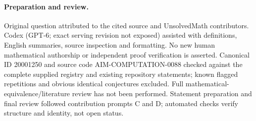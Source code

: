 \documentclass[11pt]{article}
\begin{document}
\paragraph{Preparation and review.}
Original question attributed to the cited source and UnsolvedMath contributors. Codex (GPT-6; exact serving revision not exposed) assisted with definitions, English summaries, source inspection and formatting. No new human mathematical authorship or independent proof verification is asserted. Canonical ID 20001250 and source code AIM-COMPUTATION-0088 checked against the complete supplied registry and existing repository statements; known flagged repetitions and obvious identical conjectures excluded. Full mathematical-equivalence/literature review has not been performed. Statement preparation and final review followed contribution prompts C and D; automated checks verify structure and identity, not open status.
\label{end:20001250}
\end{document}
